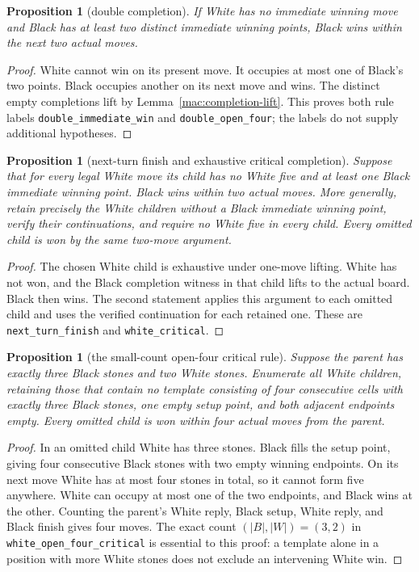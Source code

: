 \documentclass[11pt]{article}
\newtheorem{proposition}[theorem]{Proposition}
\theoremstyle{definition}
\theoremstyle{remark}
\begin{document}
\begin{proposition}[double completion]\label{mac:double-completion}
If White has no immediate winning move and Black has at least two distinct immediate winning points, Black wins within the next two actual moves.

\end{proposition}
\begin{proof}
White cannot win on its present move. It occupies at most one of Black's two points. Black occupies another on its next move and wins. The distinct empty completions lift by Lemma~\ref{mac:completion-lift}. This proves both rule labels \texttt{double\_immediate\_win} and \texttt{double\_open\_four}; the labels do not supply additional hypotheses. 
\end{proof}

\begin{proposition}[next-turn finish and exhaustive critical completion]\label{mac:finish-critical}
Suppose that for every legal White move its child has no White five and at least one Black immediate winning point. Black wins within two actual moves. More generally, retain precisely the White children without a Black immediate winning point, verify their continuations, and require no White five in every child. Every omitted child is won by the same two-move argument.

\end{proposition}
\begin{proof}
The chosen White child is exhaustive under one-move lifting. White has not won, and the Black completion witness in that child lifts to the actual board. Black then wins. The second statement applies this argument to each omitted child and uses the verified continuation for each retained one. These are \texttt{next\_turn\_finish} and \texttt{white\_critical}. 
\end{proof}

\begin{proposition}[the small-count open-four critical rule]\label{mac:small-open-four}
Suppose the parent has exactly three Black stones and two White stones. Enumerate all White children, retaining those that contain no template consisting of four consecutive cells with exactly three Black stones, one empty setup point, and both adjacent endpoints empty. Every omitted child is won within four actual moves from the parent.

\end{proposition}
\begin{proof}
In an omitted child White has three stones. Black fills the setup point, giving four consecutive Black stones with two empty winning endpoints. On its next move White has at most four stones in total, so it cannot form five anywhere. White can occupy at most one of the two endpoints, and Black wins at the other. Counting the parent's White reply, Black setup, White reply, and Black finish gives four moves. The exact count \((|B|,|W|)=(3,2)\) in \texttt{white\_open\_four\_critical} is essential to this proof: a template alone in a position with more White stones does not exclude an intervening White win. 
\end{proof}
\end{document}
